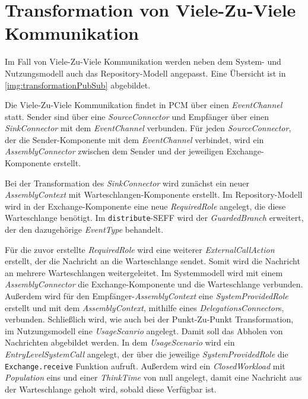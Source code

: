 \section{Transformation von Viele-Zu-Viele Kommunikation}
Im Fall von Viele-Zu-Viele Kommunikation werden neben dem System- und Nutzungsmodell auch das Repository-Modell angepasst. Eine Übersicht ist in \autoref{img:transformationPubSub} abgebildet. \par
Die Viele-Zu-Viele Kommunikation findet in PCM über einen \emph{EventChannel} statt. Sender sind über eine \emph{SourceConnector} und Empfänger über einen \emph{SinkConnector} mit dem \emph{EventChannel} verbunden. Für jeden \emph{SourceConnector}, der die Sender-Komponente mit dem \emph{EventChannel} verbindet, wird ein \emph{AssemblyConnector} zwischen dem Sender und der jeweiligen Exchange-Komponente erstellt. 
\par
Bei der Transformation des \emph{SinkConnector} wird zunächst ein neuer \emph{AssemblyContext} mit Warteschlangen-Komponente erstellt. Im Repository-Modell wird in der Exchange-Komponente eine neue \emph{RequiredRole} angelegt, die diese Warteschlange benötigt. Im \texttt{distribute}-SEFF wird der \emph{GuardedBranch} erweitert, der den dazugehörige \emph{EventType} behandelt. \par
Für die zuvor erstellte \emph{RequiredRole} wird eine weiterer \emph{ExternalCallAction} erstellt, der die Nachricht an die Warteschlange sendet. Somit wird die Nachricht an mehrere Warteschlangen weitergeleitet. Im Systemmodell wird mit einem \emph{AssemblyConnector} die Exchange-Komponente und die Warteschlange verbunden. Außerdem wird für den Empfänger-\emph{AssemblyContext} eine \emph{SystemProvidedRole} erstellt und mit dem \emph{AssemblyContext}, mithilfe eines \emph{DelegationsConnector}s, verbunden. Schließlich wird, wie auch bei der Punkt-Zu-Punkt Transformation, im Nutzungsmodell eine \emph{UsageScanrio} angelegt. Damit soll das Abholen von Nachrichten abgebildet werden. In dem \emph{UsageScenario} wird ein \emph{EntryLevelSystemCall} angelegt, der über die jeweilige \emph{SystemProvidedRole} die \texttt{Exchange.receive} Funktion aufruft. Außerdem wird ein \emph{ClosedWorkload} mit \emph{Population} eins und einer \emph{ThinkTime} von null angelegt, damit eine Nachricht aus der Warteschlange geholt wird, sobald diese Verfügbar ist.

